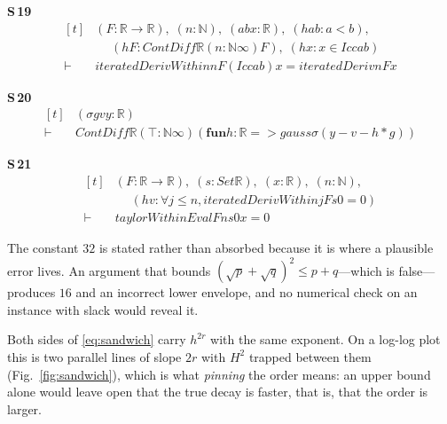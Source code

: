 \noindent\textbf{S\,19}\quad{}
{\footnotesize\[ \begin{aligned}[t]
&(\mathit{F} : \mathbb{R} \to \mathbb{R} ),\; (\mathit{n} : \mathbb{N} ),\; (\mathit{a} \mathit{b} \mathit{x} : \mathbb{R} ),\; (\mathit{hab} : \mathit{a} < \mathit{b}),\\
&\quad \; (\mathit{hF} : \mathit{ContDiff} \mathbb{R} (\mathit{n} : \mathbb{N} \infty ) \mathit{F}),\; (\mathit{hx} : \mathit{x} \in \mathit{Icc} \mathit{a} \mathit{b})\\
\vdash\;&\mathit{iteratedDerivWithin} \mathit{n} \mathit{F} (\mathit{Icc} \mathit{a} \mathit{b}) \mathit{x} = \mathit{iteratedDeriv} \mathit{n} \mathit{F} \mathit{x}
\end{aligned} \]}

\noindent\textbf{S\,20}\quad{}
{\footnotesize\[ \begin{aligned}[t]
&(\sigma \mathit{g} \mathit{v} \mathit{y} : \mathbb{R} )\\
\vdash\;&\mathit{ContDiff} \mathbb{R} (⊤ : \mathbb{N} \infty ) (\mathbf{fun} \mathit{h} : \mathbb{R} => \mathit{gauss} \sigma (\mathit{y} - \mathit{v} - \mathit{h} * \mathit{g}))
\end{aligned} \]}

\noindent\textbf{S\,21}\quad{}
{\footnotesize\[ \begin{aligned}[t]
&(\mathit{F} : \mathbb{R} \to \mathbb{R} ),\; (\mathit{s} : \mathit{Set} \mathbb{R} ),\; (\mathit{x} : \mathbb{R} ),\; (\mathit{n} : \mathbb{N} ),\\
&\quad \; (\mathit{hv} : \forall \mathit{j} \leq \mathit{n}, \mathit{iteratedDerivWithin} \mathit{j} \mathit{F} \mathit{s} 0 = 0)\\
\vdash\;&\mathit{taylorWithinEval} \mathit{F} \mathit{n} \mathit{s} 0 \mathit{x} = 0
\end{aligned} \]}


The constant $32$ is stated rather than absorbed because it is where a plausible error
lives. An argument that bounds $(\sqrt{p}+\sqrt{q})^{2}\le p+q$---which is false---produces
$16$ and an incorrect lower envelope, and no numerical check on an instance with slack would
reveal it.

Both sides of \eqref{eq:sandwich} carry $h^{2r}$ with the same exponent. On a log-log plot
this is two parallel lines of slope $2r$ with $H^{2}$ trapped between them
(Fig.~\ref{fig:sandwich}), which is what \emph{pinning} the order means: an upper bound
alone would leave open that the true decay is faster, that is, that the order is larger.

